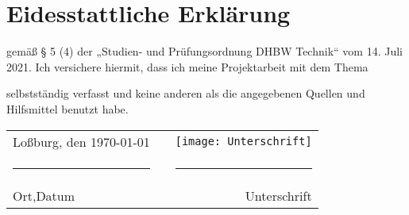 \chapter*{Eidesstattliche Erklärung}
\thispagestyle{plain}

gemäß § 5 (4) der „Studien- und Prüfungsordnung DHBW Technik“
vom 14. Juli 2021.
Ich versichere hiermit, dass ich meine Projektarbeit mit dem Thema
\begin{center}
	\textbf{\titel}
\end{center}
selbstständig verfasst und keine anderen als die angegebenen Quellen und Hilfsmittel benutzt habe.\\
\mbox{}
\vfill
\begin{tabularx}{\linewidth}{lXr}
	Loßburg, den \today 		& & \texttt{[image: Unterschrift]} \\
	\rule{50mm}{0.4pt} 			& & \rule{50mm}{0.1pt}\\
	{\footnotesize Ort,Datum}	& & {\footnotesize Unterschrift}\\\end{tabularx}